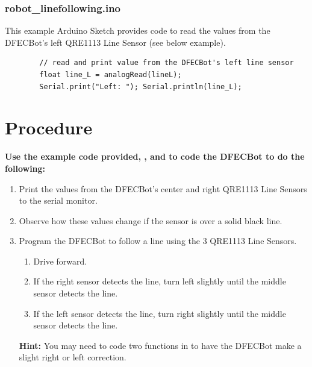 \documentclass{handout}
\begin{document}
	\subsubsection{robot\_linefollowing.ino}
	This example Arduino Sketch provides code to read the values from the DFECBot's left QRE1113 Line Sensor (see below example).
	
	\begin{lstlisting}
		// read and print value from the DFECBot's left line sensor
		float line_L = analogRead(lineL);
		Serial.print("Left: "); Serial.println(line_L);
	\end{lstlisting}
	
	\newpage
	\clearpage
	\pagebreak
	
	\section{Procedure}
	\textbf{Use the example code provided, , and  to code the DFECBot to do the following:}
		
	\begin{enumerate}
		\item Print the values from the DFECBot's center and right QRE1113 Line Sensors to the serial monitor.
		\item Observe how these values change if the sensor is over a solid black line.
		\item Program the DFECBot to follow a line using the 3 QRE1113 Line Sensors.
			\begin{enumerate}
				\item Drive forward.
				\item If the right sensor detects the line, turn left slightly until the middle sensor detects the line.
				\item If the left sensor detects the line, turn right slightly until the middle sensor detects the line.
			\end{enumerate}
		
			\textbf{Hint:} You may need to code two functions in  to have the DFECBot make a slight right or left correction.
	\end{enumerate} 	
\end{document}
